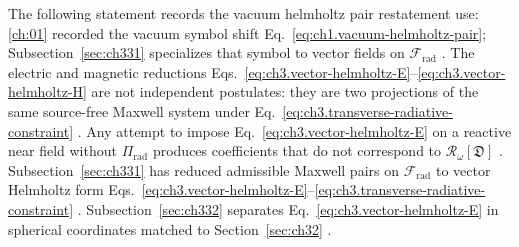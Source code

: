 The following statement records the vacuum helmholtz pair restatement use: \ref{ch:01} recorded the vacuum symbol shift Eq.~\eqref{eq:ch1.vacuum-helmholtz-pair}; Subsection~\ref{sec:ch331}
specializes that symbol to vector fields on \(\mathcal{F}_{\mathrm{rad}}\) . The
electric and magnetic reductions Eqs.~\eqref{eq:ch3.vector-helmholtz-E}--\eqref{eq:ch3.vector-helmholtz-H} are
not independent postulates: they are two projections of the same source-free Maxwell system under
Eq.~\eqref{eq:ch3.transverse-radiative-constraint} . Any attempt to impose
Eq.~\eqref{eq:ch3.vector-helmholtz-E} on a reactive near field without \(\Pi_{\mathrm{rad}}\) produces
coefficients that do not correspond to \(\mathcal{R}_\omega[\mathfrak{D}]\) .
Subsection~\ref{sec:ch331} has reduced admissible Maxwell pairs on \(\mathcal{F}_{\mathrm{rad}}\) to vector
Helmholtz form Eqs.~\eqref{eq:ch3.vector-helmholtz-E}--\eqref{eq:ch3.transverse-radiative-constraint}
. Subsection~\ref{sec:ch332} separates Eq.~\eqref{eq:ch3.vector-helmholtz-E} in
spherical coordinates matched to Section~\ref{sec:ch32} .
